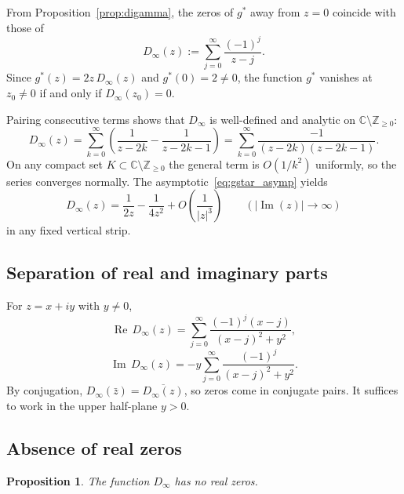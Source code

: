 \documentclass[11pt]{amsart}
\newtheorem{proposition}[theorem]{Proposition}
\theoremstyle{definition}
\theoremstyle{remark}
\newcommand{\Real}{\operatorname{Re}}
\newcommand{\Imag}{\operatorname{Im}}
\begin{document}
From Proposition~\ref{prop:digamma}, the zeros of $g^*$ away from $z = 0$ coincide with those of
\begin{equation}\label{eq:Dinfty}
D_\infty(z) := \sum_{j=0}^{\infty} \frac{(-1)^j}{z - j}.
\end{equation}
Since $g^*(z) = 2z\, D_\infty(z)$ and $g^*(0) = 2 \neq 0$, the function $g^*$ vanishes at $z_0 \neq 0$ if and only if $D_\infty(z_0) = 0$.

Pairing consecutive terms shows that $D_\infty$ is well-defined and analytic on $\mathbb{C} \setminus \mathbb{Z}_{\geq 0}$:
\begin{equation}\label{eq:Dinfty_paired}
D_\infty(z) = \sum_{k=0}^{\infty} \left(\frac{1}{z-2k} - \frac{1}{z-2k-1}\right) = \sum_{k=0}^{\infty} \frac{-1}{(z-2k)(z-2k-1)}.
\end{equation}
On any compact set $K \subset \mathbb{C} \setminus \mathbb{Z}_{\geq 0}$ the general term is $O(1/k^2)$ uniformly, so the series converges normally. The asymptotic~\eqref{eq:gstar_asymp} yields
\begin{equation}\label{eq:Dinfty_asymp}
D_\infty(z) = \frac{1}{2z} - \frac{1}{4z^2} + O\!\left(\frac{1}{|z|^3}\right) \qquad (|\Imag(z)| \to \infty)
\end{equation}
in any fixed vertical strip.


\subsection{Separation of real and imaginary parts}

For $z = x + iy$ with $y \neq 0$,
\begin{equation}\label{eq:real_part}
\Real\, D_\infty(z) = \sum_{j=0}^{\infty} \frac{(-1)^j(x-j)}{(x-j)^2 + y^2},
\end{equation}
\begin{equation}\label{eq:imag_part}
\Imag\, D_\infty(z) = -y \sum_{j=0}^{\infty} \frac{(-1)^j}{(x-j)^2 + y^2}.
\end{equation}
By conjugation, $D_\infty(\bar z) = \overline{D_\infty(z)}$, so zeros come in conjugate pairs. It suffices to work in the upper half-plane $y > 0$.


\subsection{Absence of real zeros}

\begin{proposition}\label{prop:no_real_zeros}
The function $D_\infty$ has no real zeros.
\end{proposition}
\end{document}
